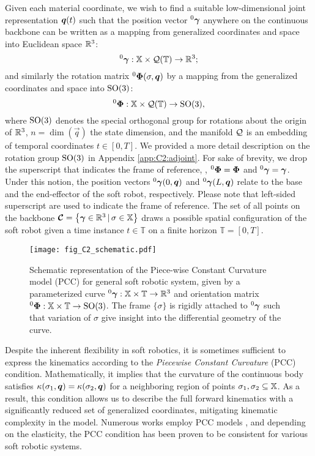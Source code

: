 Given each material coordinate, we wish to find a suitable low-dimensional joint representation ${\boldsymbol{q}}(t)$ such that the position vector $^0{\boldsymbol{\gamma}}$ anywhere on the continuous backbone can be written as a mapping from generalized coordinates and space into Euclidean space $\mathbb{R}^3$:
%
\begin{equation}
^0{\boldsymbol{\gamma}}: \mathbb{X} \times \mathcal{Q}(\mathbb{T}) \to \mathbb{R}^3;
\end{equation}
%
and similarly the rotation matrix $^0\boldsymbol{\Phi}(\sigma,\boldsymbol{q})$ by a mapping from the generalized coordinates and space into $\textup{\textrm{SO}}(3)$:
%
\begin{equation}
^0{\boldsymbol{\Phi}}: \mathbb{X} \times \mathcal{Q}(\mathbb{T}) \to \textup{\textrm{SO}}(3), \label{eq:phi_map}
\end{equation}
%
where {$\textup{\textrm{SO}}(3)$ denotes the special orthogonal group for rotations about the origin of $\mathbb{R}^3$}, $n = \dim(\vec{q})$ the state dimension, and the manifold $\mathcal{Q}$ is an embedding of temporal coordinates $t \in [0,T]$. We provided a more detail description on the rotation group $\textup{\textrm{SO}}(3)$ in Appendix \ref{app:C2:adjoint}. For sake of brevity, we drop the superscript that indicates the frame of reference, \ie, $^0{\boldsymbol{\Phi}} = {\boldsymbol{\Phi}}$ and $^0{\boldsymbol{\gamma}} = {\boldsymbol{\gamma}}$. Under this notion, the position vectors $^0{\boldsymbol{\gamma}}(0,{\boldsymbol{q}})$ and
$^0{\boldsymbol{\gamma}}(L,{\boldsymbol{q}})$ relate to the base and the end-effector of the soft robot, respectively. {Please note that left-sided superscript are used to indicate the frame of reference.} The set of all points on the backbone
$\boldsymbol{\mathcal{C}} = \left\{{\boldsymbol{\gamma}} \in \mathbb{R}^3\, |\, \sigma \in \mathbb{X} \right\}$ draws a possible {spatial} configuration of the soft robot given {a time instance $t \in \mathbb{T}$ on a finite horizon $\mathbb{T} = [0,T]$}.
%
\begin{figure}[!t]
  \vspace{-0.6mm}
  \centering
  \ifx\printFigures\undefined
  \else
  \texttt{[image: fig\_C2\_schematic.pdf]}
  \fi
  \caption{Schematic representation of the Piece-wise Constant Curvature model (PCC) for general soft robotic system, given by a parameterized curve $^0 {\boldsymbol{\gamma}}: \mathbb{X} \times \mathbb{T} \to \mathbb{R}^3$ and orientation matrix $^0 {\boldsymbol{\Phi}}: \mathbb{X} \times \mathbb{T} \to \textup{\textrm{SO}}(3)$. The frame $\{\sigma\}$ is rigidly attached to $^0 {\boldsymbol{\gamma}}$ such that variation of $\sigma$ give insight into the differential geometry of the curve.}
  \label{fig:C2:configuration}
\end{figure}
%
\begin{dfn}
Despite the inherent flexibility in soft robotics, it is sometimes sufficient to express the kinematics according to the \emph{Piecewise Constant Curvature} (PCC) condition. Mathematically, it implies that the curvature of the continuous body satisfies $\kappa(\sigma_1,{\boldsymbol{q}}) = \kappa(\sigma_2,{\boldsymbol{q}})$ for a neighboring region of points $\sigma_1,\sigma_2 \subseteq \mathbb{X}$. As a result, this condition allows us to describe the full forward kinematics with a significantly reduced set of generalized coordinates, mitigating kinematic complexity in the model. Numerous works employ PCC models \cite{Falkenhahn2015,Katzschmann2019,Tatlicioglu2007,Marchese2016,Godage2016,DellaSantina2020a}, and depending on the elasticity, the PCC condition has been proven to be consistent for various soft robotic systems.
\end{dfn}
